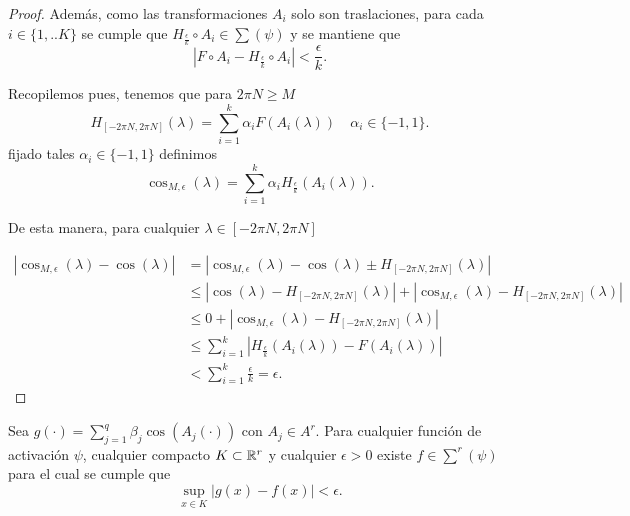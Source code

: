 \begin{proof}
    Además, como las transformaciones $A_i$ solo son traslaciones,
    para cada $i \in \{1,..K\}$ se cumple que 
     $H_{ \frac{\epsilon}{k}} \circ A_i \in \sum(\psi)$ y se mantiene que 
    \begin{equation}
        |F \circ A_i - H_{ \frac{\epsilon}{k}} \circ A_i | < \frac{\epsilon}{k}. 
    \end{equation}


    Recopilemos pues, tenemos que para $2\pi N \geq M$
    \begin{equation}
        H_{[-2\pi N, 2 \pi N]}(\lambda) = 
        \sum_{i=1}^k \alpha_i F( A_i(\lambda)) \quad \alpha_i \in \{-1,1\}.
    \end{equation}
    fijado tales $\alpha_i \in \{-1,1\}$ definimos 
    \begin{equation}
        \cos_{M, \epsilon}(\lambda) = \sum_{i=1}^k 
        \alpha_i  H_{ \frac{\epsilon}{k}}(A_i(\lambda)). 
    \end{equation}

    De esta manera, para cualquier $\lambda \in [-2\pi N, 2 \pi N]$

    \begin{equation}
        \begin{split}
            |\cos_{M,\epsilon}(\lambda) - \cos(\lambda)| 
            &= |\cos_{M,\epsilon}(\lambda) - \cos(\lambda) \pm  H_{[-2\pi N, 2 \pi N]}(\lambda)| \\
            &\leq
            |\cos(\lambda) -  H_{[-2\pi N, 2 \pi N]}(\lambda)|
            + 
            | \cos_{M,\epsilon}(\lambda) -  H_{[-2\pi N, 2 \pi N]}(\lambda)|  \\
            &\leq  0 
            + | \cos_{M,\epsilon}(\lambda) -  H_{[-2\pi N, 2 \pi N]}(\lambda)| \\
            & \leq  \sum_{i=1}^k 
            |  H_{ \frac{\epsilon}{k}}(A_i(\lambda)) 
            -
            F( A_i(\lambda))
             | \\
             & <   \sum_{i=1}^k \frac{\epsilon}{k} = \epsilon .
        \end{split}
    \end{equation}
 
\end{proof}

\begin{lema}
    Sea $g(\cdot) = \sum_{j=1}^q \beta_j \cos(A_j(\cdot))$ con 
    $A_j \in A^r$. 
    Para cualquier función de activación $\psi$, 
    cualquier compacto $K \subset \mathbb{R}^r$
    y cualquier $\epsilon > 0$
    existe $f \in \sum^r(\psi)$ para el cual se cumple que 
    \begin{equation}
        \sup_{x \in K} 
        |g(x) - f(x)| < \epsilon.
    \end{equation}
\end{lema}

